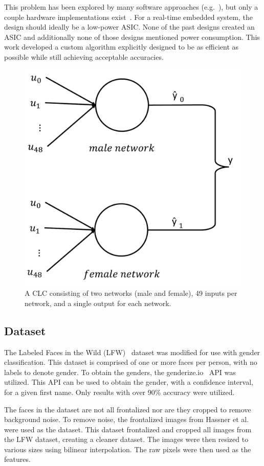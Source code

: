 \documentclass[10pt,journal]{IEEEtran}
\begin{document}
		This problem has been explored by many software approaches (e.g.~\cite{sw_comparison,sw_svm,sw_cnn}), but only a couple hardware implementations exist~\cite{ann_fpga,svm_fpga}. For a real-time embedded system, the design should ideally be a low-power ASIC. None of the past designs created an ASIC and additionally none of those designs mentioned power consumption. This work developed a custom algorithm explicitly designed to be as efficient as possible while still achieving acceptable accuracies.
		
		\begin{figure}
			\centering
			\includegraphics[width=0.8\linewidth]{network}
			\caption{A CLC consisting of two networks (male and female), 49 inputs per network, and a single output for each network.}
			\label{fig:network}
		\end{figure}
	
	\subsection{Dataset}
		The Labeled Faces in the Wild (LFW)~\cite{lfw} dataset was modified for use with gender classification. This dataset is comprised of one or more faces per person, with no labels to denote gender. To obtain the genders, the genderize.io~\cite{genderize} API was utilized. This API can be used to obtain the gender, with a confidence interval, for a given first name. Only results with over 90\% accuracy were utilized.
		
		The faces in the dataset are not all frontalized nor are they cropped to remove background noise. To remove noise, the frontalized images from Hassner et al.~\cite{frontalize} were used as the dataset. This dataset frontalized and cropped all images from the LFW dataset, creating a cleaner dataset. The images were then resized to various sizes using bilinear interpolation. The raw pixels were then used as the features.
		
\end{document}
